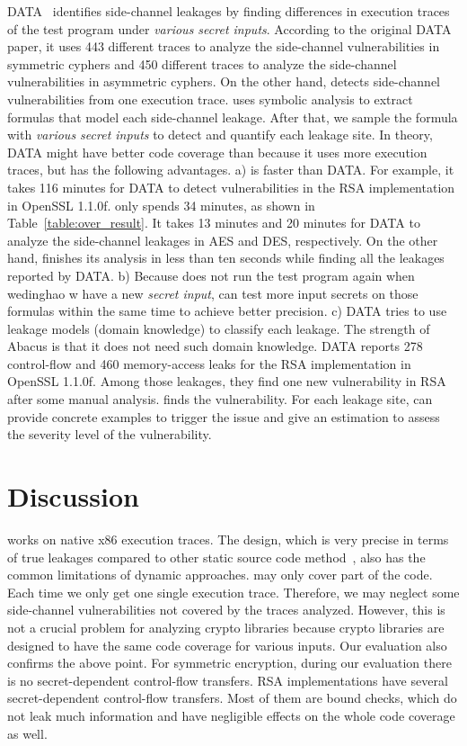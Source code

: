 DATA~\cite{217537} identifies
side-channel leakages by finding differences in execution traces of
the test program under \emph{various secret inputs}. According to
the original DATA paper, it uses 443 different traces to analyze the
side-channel vulnerabilities in symmetric cyphers and 450 different
traces to analyze the side-channel vulnerabilities in asymmetric
cyphers. On the other hand, \tool{} detects side-channel
vulnerabilities from one execution trace. \tool{} uses symbolic
analysis to extract formulas that model each side-channel
leakage. After that, we sample the formula with \emph{various
  secret inputs} to detect and quantify each leakage site. In
theory, DATA might have better code coverage than \tool{} because it
uses more execution traces,  but \tool{} has the following
advantages. a) \tool{} is faster than DATA. For example, it takes
116 minutes for DATA to detect vulnerabilities in the RSA implementation in OpenSSL 1.1.0f\@. \tool{} only spends 34 minutes, as shown in Table~\ref{table:over_result}. It takes 13 minutes and 20 minutes
for DATA to analyze the side-channel leakages in AES and DES,
respectively. On the other hand, \tool{} finishes its analysis in
less than ten seconds while finding all the leakages reported by
DATA. b) Because \tool{} does not run the test program again when wedinghao w
have a new \emph{secret input}, \tool{} can test more input secrets
on those formulas within the same time to achieve better precision.
c) DATA tries to use leakage models (domain knowledge) to classify each leakage.
The strength of Abacus is that it does not need such domain knowledge.
DATA reports 278 control-flow and 460 memory-access leaks for the RSA implementation in OpenSSL 1.1.0f. Among those leakages, they find one new vulnerability in RSA after some manual analysis.
\tool{} finds the vulnerability.  For each leakage site, \tool{} can provide
concrete examples to trigger the issue and give an estimation to
assess the severity level of the vulnerability.

\section{Discussion}


\tool{} works on native x86 execution traces. The design, which is very
precise in terms of true leakages compared to other static source code
method~\cite{197207,BacelarAlmeida:2013:FVS:2483313.2483334}, also has
the common limitations of dynamic approaches. \tool{} may only cover part of the code.
Each time we only get one single execution trace. Therefore,
we may neglect some side-channel vulnerabilities not covered by the traces analyzed.
However, this is not a crucial problem for analyzing crypto libraries because crypto
libraries are designed to have the same code coverage for various inputs. Our
evaluation also confirms the above point. For symmetric encryption, during our
evaluation there is no secret-dependent control-flow transfers. RSA
implementations have several secret-dependent control-flow transfers.
Most of them are  %
bound checks, which do not leak much information and have negligible effects
on the whole code coverage as well.

